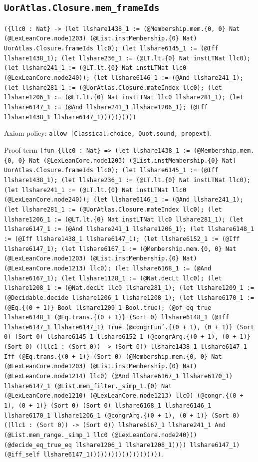 \documentclass[11pt]{article}
\begin{document}
\subsection*{\texttt{UorAtlas.Closure.mem\_frameIds}}
\noindent\texttt{(\{llc0 : Nat\} -> (let llshare1438\_1 := (@Membership.mem.\{0, 0\} Nat (@LexLeanCore.node1203) (@List.instMembership.\{0\} Nat) UorAtlas.Closure.frameIds llc0); (let llshare6145\_1 := (@Iff llshare1438\_1); (let llshare236\_1 := (@LT.lt.\{0\} Nat instLTNat llc0); (let llshare241\_1 := (@LT.lt.\{0\} Nat instLTNat llc0 (@LexLeanCore.node240)); (let llshare6146\_1 := (@And llshare241\_1); (let llshare281\_1 := (@UorAtlas.Closure.mateIndex llc0); (let llshare1206\_1 := (@LT.lt.\{0\} Nat instLTNat llc0 llshare281\_1); (let llshare6147\_1 := (@And llshare241\_1 llshare1206\_1); (@Iff llshare1438\_1 llshare6147\_1))))))))))}\par
\noindent Axiom policy: \texttt{allow [Classical.choice, Quot.sound, propext]}.\par
\noindent Proof term \texttt{(fun \{llc0 : Nat\} => (let llshare1438\_1 := (@Membership.mem.\{0, 0\} Nat (@LexLeanCore.node1203) (@List.instMembership.\{0\} Nat) UorAtlas.Closure.frameIds llc0); (let llshare6145\_1 := (@Iff llshare1438\_1); (let llshare236\_1 := (@LT.lt.\{0\} Nat instLTNat llc0); (let llshare241\_1 := (@LT.lt.\{0\} Nat instLTNat llc0 (@LexLeanCore.node240)); (let llshare6146\_1 := (@And llshare241\_1); (let llshare281\_1 := (@UorAtlas.Closure.mateIndex llc0); (let llshare1206\_1 := (@LT.lt.\{0\} Nat instLTNat llc0 llshare281\_1); (let llshare6147\_1 := (@And llshare241\_1 llshare1206\_1); (let llshare6148\_1 := (@Iff llshare1438\_1 llshare6147\_1); (let llshare6152\_1 := (@Iff llshare6147\_1); (let llshare6167\_1 := (@Membership.mem.\{0, 0\} Nat (@LexLeanCore.node1203) (@List.instMembership.\{0\} Nat) (@LexLeanCore.node1213) llc0); (let llshare6168\_1 := (@And llshare6167\_1); (let llshare1128\_1 := (@Nat.decLt llc0); (let llshare1208\_1 := (@Nat.decLt llc0 llshare281\_1); (let llshare1209\_1 := (@Decidable.decide llshare1206\_1 llshare1208\_1); (let llshare6170\_1 := (@Eq.\{(0 + 1)\} Bool llshare1209\_1 Bool.true); (@of\_eq\_true llshare6148\_1 (@Eq.trans.\{(0 + 1)\} (Sort 0) llshare6148\_1 (@Iff llshare6147\_1 llshare6147\_1) True (@congrFun'.\{(0 + 1), (0 + 1)\} (Sort 0) (Sort 0) llshare6145\_1 llshare6152\_1 (@congrArg.\{(0 + 1), (0 + 1)\} (Sort 0) ((llc1 : (Sort 0)) -> (Sort 0)) llshare1438\_1 llshare6147\_1 Iff (@Eq.trans.\{(0 + 1)\} (Sort 0) (@Membership.mem.\{0, 0\} Nat (@LexLeanCore.node1203) (@List.instMembership.\{0\} Nat) (@LexLeanCore.node1214) llc0) (@And llshare6167\_1 llshare6170\_1) llshare6147\_1 (@List.mem\_filter.\_simp\_1.\{0\} Nat (@LexLeanCore.node1210) (@LexLeanCore.node1213) llc0) (@congr.\{(0 + 1), (0 + 1)\} (Sort 0) (Sort 0) llshare6168\_1 llshare6146\_1 llshare6170\_1 llshare1206\_1 (@congrArg.\{(0 + 1), (0 + 1)\} (Sort 0) ((llc1 : (Sort 0)) -> (Sort 0)) llshare6167\_1 llshare241\_1 And (@List.mem\_range.\_simp\_1 llc0 (@LexLeanCore.node240))) (@decide\_eq\_true\_eq llshare1206\_1 llshare1208\_1)))) llshare6147\_1) (@iff\_self llshare6147\_1))))))))))))))))))))}.\par
\end{document}
